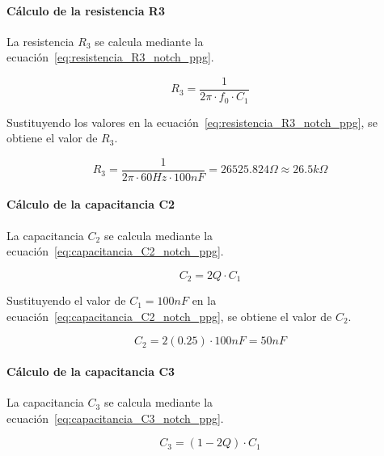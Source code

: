         \paragraph{Cálculo de la resistencia R3}
        La resistencia $R_3$ se calcula mediante la ecuación~\ref{eq:resistencia_R3_notch_ppg}.

        \begin{equation}
            \label{eq:resistencia_R3_notch_ppg}
            R_3 = \frac{1}{2\pi \cdot f_0 \cdot C_1}
        \end{equation}

        Sustituyendo los valores en la ecuación~\ref{eq:resistencia_R3_notch_ppg}, se obtiene el valor de $R_3$.

        \begin{equation}
            R_3 = \frac{1}{2\pi \cdot 60 Hz \cdot 100 nF} = 26525.824 \Omega \approx 26.5 k\Omega
        \end{equation}

        \paragraph{Cálculo de la capacitancia C2}
        La capacitancia $C_2$ se calcula mediante la ecuación~\ref{eq:capacitancia_C2_notch_ppg}.

        \begin{equation}
            \label{eq:capacitancia_C2_notch_ppg}
            C_2 = 2Q \cdot C_1
        \end{equation}

        Sustituyendo el valor de $C_1 = 100 nF$ en la ecuación~\ref{eq:capacitancia_C2_notch_ppg}, se obtiene el valor de $C_2$.

        \begin{equation}
            C_2 = 2(0.25) \cdot 100 nF = 50 nF
        \end{equation}

        \paragraph{Cálculo de la capacitancia C3}

        La capacitancia $C_3$ se calcula mediante la ecuación~\ref{eq:capacitancia_C3_notch_ppg}.

        \begin{equation}
            \label{eq:capacitancia_C3_notch_ppg}
            C_3 = (1 - 2Q) \cdot C_1
        \end{equation}

